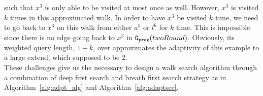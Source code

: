 such that $x^3$ is only able to be visited at most once as well.
%
However, $x^3$ is visited $k$ times in this approximated walk.
In order to have $x^3$ be visited $k$ time, we need to go back to 
$x^3$ on this walk from either $a^5$ or $l^6$ for $k$ time.
This is impossible since there is no edge going back to $x^3$ in $\mathtt{{G_{prog}}}(twoRound)$.
Obviously,
its weighted query length, $1 + k$, 
over approximates 
the adaptivity of this example to a large extend, which supposed to be $2$. 
\\
These challenges give us the necessary to design a walk search algorithm through a combination of 
deep first search and breath first search strategy
as in Algorithm~\ref{alg:adpt_alg} and Algorithm~\ref{alg:adaptscc}.
%
